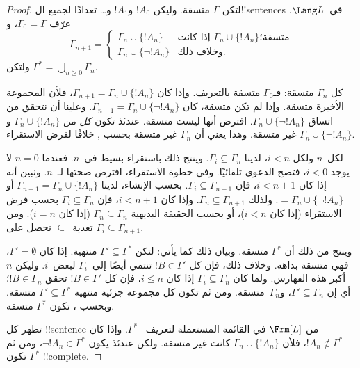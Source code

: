 \documentclass[../../../include/open-logic-section]{subfiles}
\begin{document}
\begin{proof}
لتكن $\Gamma$ متسقة. وليكن $!A_0$ و$!A_1$ و\dots{} تعدادًا لجميع
ال!!{sentence}s في~$\Lang L$. عرّف $\Gamma_0 = \Gamma$، و
\[
\Gamma_{n+1} =
\begin{cases}
\Gamma_n \cup \{ !A_n \} & \textrm{إذا كانت $\Gamma_n \cup \{!A_n\}$
  متسقة؛} \\
\Gamma_n \cup \{ \lnot !A_n \} & \textrm{وخلاف ذلك.}
\end{cases}
\]
ولتكن $\Gamma^* = \bigcup_{n \geq 0} \Gamma_n$.

كل $\Gamma_n$ متسقة: فـ$\Gamma_0$ متسقة بالتعريف. وإذا كان
$\Gamma_{n+1} = \Gamma_n \cup \{!A_n\}$، فلأن المجموعة الأخيرة متسقة.
وإذا لم تكن متسقة، كان $\Gamma_{n+1} = \Gamma_n \cup \{\lnot !A_n\}$.
وعلينا أن نتحقق من اتساق $\Gamma_n \cup \{\lnot !A_n\}$. افترض أنها
ليست متسقة. عندئذ تكون \emph{كل من} $\Gamma_n \cup \{!A_n\}$ و
$\Gamma_n \cup \{\lnot !A_n\}$ غير متسقة. وهذا يعني أن $\Gamma_n$
غير متسقة بحسب
,
خلافًا لفرض الاستقراء.

لكل~$n$ ولكل $i < n$، لدينا $\Gamma_i \subseteq \Gamma_n$. وينتج ذلك
باستقراء بسيط في~$n$. فعندما $n=0$ لا يوجد $i < 0$، فتصح الدعوى
تلقائيًا. وفي خطوة الاستقراء، افترض صحتها لـ~$n$. ونبين أنه إذا كان
$i < n+1$، فإن $\Gamma_i \subseteq \Gamma_{n+1}$. بحسب الإنشاء، لدينا
$\Gamma_{n+1} = \Gamma_n \cup \{!A_n\}$ أو $= \Gamma_n \cup \{\lnot
!A_n\}$. ولذلك $\Gamma_n \subseteq \Gamma_{n+1}$. وإذا كان $i < n+1$،
فإن $\Gamma_i \subseteq \Gamma_n$ بحسب فرض الاستقراء (إذا كان
$i < n$)، أو بحسب الحقيقة البديهية $\Gamma_n \subseteq \Gamma_n$
(إذا كان $i = n$). ومن تعدية~$\subseteq$ نحصل على
$\Gamma_i \subseteq \Gamma_{n+1}$.

وينتج من ذلك أن $\Gamma^*$ متسقة. وبيان ذلك كما يأتي: لتكن
$\Gamma' \subseteq \Gamma^*$ منتهية. إذا كان $\Gamma'=\emptyset$، فهي
متسقة بداهة. وخلاف ذلك، فإن كل $!B \in \Gamma'$ تنتمي أيضًا
إلى~$\Gamma_i$ لبعض~$i$. وليكن $n$ أكبر هذه الفهارس. ولما كان
$\Gamma_i \subseteq \Gamma_n$ إذا كان $i \le n$، فإن كل
$!B \in \Gamma'$ تحقق $!B \in \Gamma_n$؛ أي إن
$\Gamma' \subseteq \Gamma_n$، و$\Gamma_n$~متسقة. ومن ثم تكون كل مجموعة
جزئية منتهية $\Gamma' \subseteq \Gamma^*$ متسقة. وبحسب ، تكون $\Gamma^*$ متسقة.

تظهر كل !!{sentence} من $\Frm[L]$ في القائمة المستعملة لتعريف
~$\Gamma^*$. وإذا كان $!A_n \notin \Gamma^*$، فلأن
$\Gamma_n \cup \{!A_n\}$ كانت غير متسقة. ولكن عندئذ يكون
$\lnot !A_n \in \Gamma^*$، ومن ثم تكون $\Gamma^*$ !!{complete}.
\end{proof}
\end{document}
